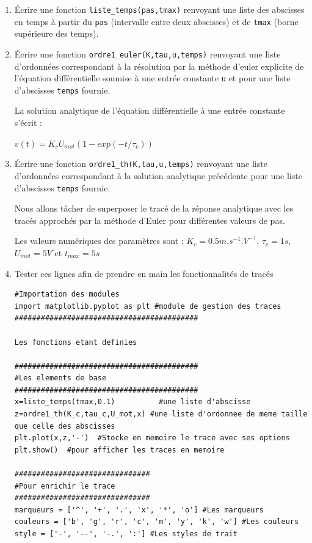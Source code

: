 \documentclass[10pt]{article}
\begin{document}
\begin{enumerate}
\item \'Ecrire une fonction {\tt{liste\_temps(pas,tmax)}} renvoyant une liste des abscisses en temps \`a partir du {\tt pas} (intervalle entre deux abscisses) et de {\tt tmax} (borne sup\'erieure des temps).

\item \'Ecrire une fonction {\tt ordre1\_euler(K,tau,u,temps)} renvoyant une liste d'ordonn\'ees correspondant \`a la r\'esolution par la m\'ethode d'euler explicite de l'\'equation diff\'erentielle soumise \`a une entr\'ee constante {\tt u} et pour une liste d'abscisses {\tt temps} fournie.

La solution analytique de l'\'equation diff\'erentielle \`a une entr\'ee constante s'\'ecrit : 
\begin{center}
$v(t) = K_c U_{mot}\left(1 - exp\left(-t/\tau_c\right)\right)$
\end{center}

\item \'Ecrire une fonction {\tt ordre1\_th(K,tau,u,temps)} renvoyant une liste d'ordonn\'ees correspondant \`a la solution analytique pr\'ec\'edente pour une liste d'abscisses {\tt temps} fournie.

Nous allons t\^acher de superposer le trac\'e de la r\'eponse analytique avec les trac\'es approch\'es par la m\'ethode d'Euler pour diff\'erentes valeurs de pas.

Les valeurs num\'eriques des param\`etres sont :
$K_c=0.5 m.s^{-1}.V^{-1}$, $\tau_c = 1 s$, $U_{mot} = 5 V$ et $t_{max}=5 s$


\item Tester ces lignes afin de prendre en main les fonctionnalit\'es de trac\'es 
\begin{verbatim}
#Importation des modules
import matplotlib.pyplot as plt #module de gestion des traces
##########################################

Les fonctions etant definies

##########################################
#Les elements de base
##########################################
x=liste_temps(tmax,0.1)          #une liste d'abscisse
z=ordre1_th(K_c,tau_c,U_mot,x) #une liste d'ordonnee de meme taille que celle des abscisses
plt.plot(x,z,'-')  #Stocke en memoire le trace avec ses options
plt.show()  #pour afficher les traces en memoire

###############################
#Pour enrichir le trace
###############################
marqueurs = ['^', '+', '.', 'x', '*', 'o'] #Les marqueurs
couleurs = ['b', 'g', 'r', 'c', 'm', 'y', 'k', 'w'] #Les couleurs
style = ['-', '--', '-.', ':'] #Les styles de trait


\end{verbatim}
\end{enumerate}
\end{document}
